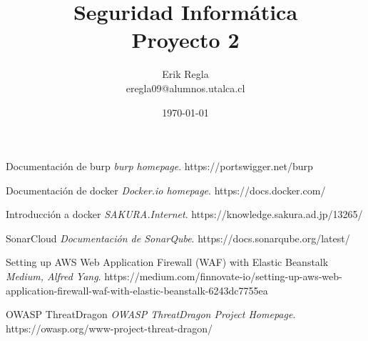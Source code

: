 \documentclass[11pt]{utalcaDoc}
\title{{\bf Seguridad Informática}\\ Proyecto 2}
\author{Erik Regla\\ eregla09@alumnos.utalca.cl}
\date{\today}
\begin{document}
\maketitle
\newpage
\tableofcontents
\newpage










\begin{thebibliography}{9}

	Documentación de burp
	\textit{burp homepage}.
	https://portswigger.net/burp

	Documentación de docker
	\textit{Docker.io homepage}.
	https://docs.docker.com/

	Introducción a docker
	\textit{SAKURA.Internet}.
	https://knowledge.sakura.ad.jp/13265/


	SonarCloud
	\textit{Documentación de SonarQube}.
	https://docs.sonarqube.org/latest/


	Setting up AWS Web Application Firewall (WAF) with Elastic Beanstalk
	\textit{Medium, Alfred Yang}.
	https://medium.com/finnovate-io/setting-up-aws-web-application-firewall-waf-with-elastic-beanstalk-6243dc7755ea


	OWASP ThreatDragon
	\textit{OWASP ThreatDragon Project Homepage}.
	https://owasp.org/www-project-threat-dragon/

\end{thebibliography}
\end{document}
